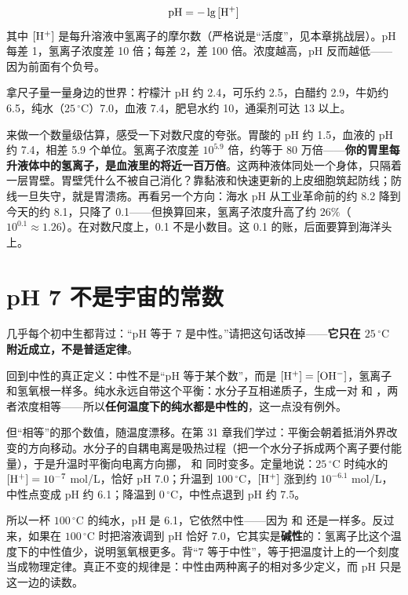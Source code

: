 \begin{qiaoliang}
\[\mathrm{pH} = -\lg\,[\mathrm{H^+}]\]
其中 $[\mathrm{H^+}]$ 是每升溶液中氢离子的摩尔数（严格说是“活度”，见本章挑战层）。pH 每差 1，氢离子浓度差 10 倍；每差 2，差 100 倍。浓度越高，pH 反而越低——因为前面有个负号。
\end{qiaoliang}

拿尺子量一量身边的世界：柠檬汁 pH 约 2.4，可乐约 2.5，白醋约 2.9，牛奶约 6.5，纯水（$25\,^{\circ}\mathrm{C}$）7.0，血液 7.4，肥皂水约 10，通渠剂可达 13 以上。

来做一个数量级估算，感受一下对数尺度的夸张。胃酸的 pH 约 1.5，血液的 pH 约 7.4，相差 5.9 个单位。氢离子浓度差 $10^{5.9}$ 倍，约等于 80 万倍——\textbf{你的胃里每升液体中的氢离子，是血液里的将近一百万倍}。这两种液体同处一个身体，只隔着一层胃壁。胃壁凭什么不被自己消化？靠黏液和快速更新的上皮细胞筑起防线；防线一旦失守，就是胃溃疡。再看另一个方向：海水 pH 从工业革命前的约 8.2 降到今天的约 8.1，只降了 0.1——但换算回来，氢离子浓度升高了约 $26\%$（$10^{0.1}\approx1.26$）。在对数尺度上，0.1 不是小数目。这 0.1 的账，后面要算到海洋头上。

\section{pH 7 不是宇宙的常数}

几乎每个初中生都背过：“pH 等于 7 是中性。”请把这句话改掉——\textbf{它只在 $25\,^{\circ}\mathrm{C}$ 附近成立，不是普适定律}。

回到中性的真正定义：中性不是“pH 等于某个数”，而是 $[\mathrm{H^+}]=[\mathrm{OH^-}]$，氢离子和氢氧根一样多。纯水永远自带这个平衡：水分子互相递质子，生成一对  和 ，两者浓度相等——所以\textbf{任何温度下的纯水都是中性的}，这一点没有例外。

但“相等”的那个数值，随温度漂移。在第 31 章我们学过：平衡会朝着抵消外界改变的方向移动。水分子的自耦电离是吸热过程（把一个水分子拆成两个离子要付能量），于是升温时平衡向电离方向挪， 和  同时变多。定量地说：$25\,^{\circ}\mathrm{C}$ 时纯水的 $[\mathrm{H^+}]=10^{-7}$ mol/L，恰好 pH 7.0；升温到 $100\,^{\circ}\mathrm{C}$，$[\mathrm{H^+}]$ 涨到约 $10^{-6.1}$ mol/L，中性点变成 pH 约 6.1；降温到 $0\,^{\circ}\mathrm{C}$，中性点退到 pH 约 7.5。

所以一杯 $100\,^{\circ}\mathrm{C}$ 的纯水，pH 是 6.1，它依然中性——因为  和  还是一样多。反过来，如果在 $100\,^{\circ}\mathrm{C}$ 时把溶液调到 pH 恰好 7.0，它其实是\textbf{碱性}的：氢离子比这个温度下的中性值少，说明氢氧根更多。背“7 等于中性”，等于把温度计上的一个刻度当成物理定律。真正不变的规律是：中性由两种离子的相对多少定义，而 pH 只是  这一边的读数。

